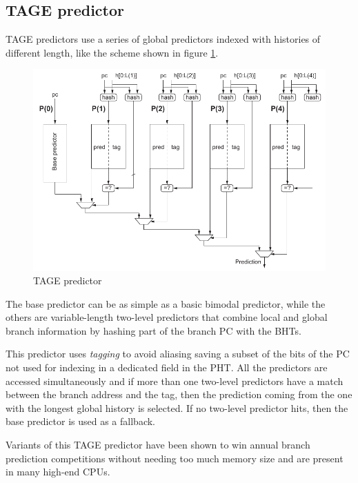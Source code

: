 \subsection{\acl{TAGE} predictor}
\acf{TAGE} predictors \cite{seznec06} use a series of global predictors indexed with histories of different length, like the scheme shown in figure \ref{fig:tage}.
\begin{figure}[hbtp]
  \centering
  \includegraphics[width=\textwidth]{img/tage.pdf}
  \caption{\ac{TAGE} predictor \cite[p.~188]{hennessy17}}
  \label{fig:tage}
\end{figure}
The base predictor can be as simple as a basic bimodal predictor, while the others are variable-length two-level predictors that combine local and global branch information by hashing part of the branch \ac{PC} with the \acp{BHT}.

This predictor uses \emph{tagging} to avoid aliasing saving a subset of the bits of the \ac{PC} not used for indexing in a dedicated field in the \ac{PHT}. All the predictors are accessed simultaneously and if more than one two-level predictors have a match between the branch address and the tag, then the prediction coming from the one with the longest global history is selected. If no two-level predictor hits, then the base predictor is used as a fallback.

Variants of this \ac{TAGE} predictor have been shown to win annual branch prediction competitions without needing too much memory size \cite[p.~189]{hennessy17} and are present in many high-end \acp{CPU}.

